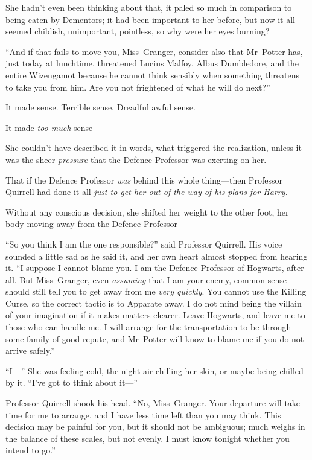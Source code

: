 She hadn’t even been thinking about that, it paled so much in comparison to being eaten by Dementors; it had been important to her before, but now it all seemed childish, unimportant, pointless, so why were her eyes burning?

“And if that fails to move you, Miss~Granger, consider also that Mr~Potter has, just today at lunchtime, threatened Lucius Malfoy, Albus Dumbledore, and the entire Wizengamot because he cannot think sensibly when something threatens to take you from him. Are you not frightened of what he will do next?”

It made sense. Terrible sense. Dreadful awful sense.

It made \emph{too much} sense—

She couldn’t have described it in words, what triggered the realization, unless it was the sheer \emph{pressure} that the Defence Professor was exerting on her.

That if the Defence Professor \emph{was} behind this whole thing—then Professor Quirrell had done it all \emph{just to get her out of the way of his plans for Harry.}

Without any conscious decision, she shifted her weight to the other foot, her body moving away from the Defence Professor—

“So you think I am the one responsible?” said Professor Quirrell. His voice sounded a little sad as he said it, and her own heart almost stopped from hearing it. “I suppose I cannot blame you. I am the Defence Professor of Hogwarts, after all. But Miss~Granger, even \emph{assuming} that I am your enemy, common sense should still tell you to get away from me \emph{very quickly}. You cannot use the Killing Curse, so the correct tactic is to Apparate away. I do not mind being the villain of your imagination if it makes matters clearer. Leave Hogwarts, and leave me to those who can handle me. I will arrange for the transportation to be through some family of good repute, and Mr~Potter will know to blame me if you do not arrive safely.”

“I—” She was feeling cold, the night air chilling her skin, or maybe being chilled by it. “I’ve got to think about it—”

Professor Quirrell shook his head. “No, Miss~Granger. Your departure will take time for me to arrange, and I have less time left than you may think. This decision may be painful for you, but it should not be ambiguous; much weighs in the balance of these scales, but not evenly. I must know tonight whether you intend to go.”

